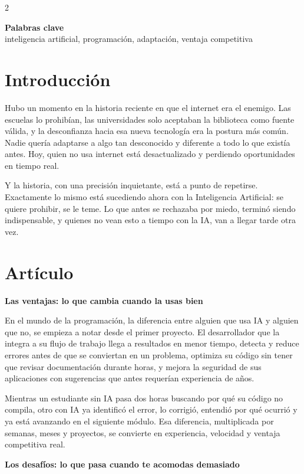 \documentclass[10pt,spanish,Letterpaper,openany]{book}
\let\origtextbf\textbf
\renewcommand{\textbf}[1]{{\color{textlinetitle}\origtextbf{#1}}}
\begin{document}
\begin {multicols}{2}

\textbf{Palabras clave}\\
inteligencia artificial, programación, adaptación, ventaja competitiva

\section{Introducción}\label{introducciuxf3n-7}

Hubo un momento en la historia reciente en que el internet era el enemigo. Las escuelas lo prohibían, las universidades solo aceptaban la biblioteca como fuente válida, y la desconfianza hacia esa nueva tecnología era la postura más común. Nadie quería adaptarse a algo tan desconocido y diferente a todo lo que existía antes. Hoy, quien no usa internet está desactualizado y perdiendo oportunidades en tiempo real.

Y la historia, con una precisión inquietante, está a punto de repetirse. Exactamente lo mismo está sucediendo ahora con la Inteligencia Artificial: se quiere prohibir, se le teme. Lo que antes se rechazaba por miedo, terminó siendo indispensable, y quienes no vean esto a tiempo con la IA, van a llegar tarde otra vez.

\section{Artículo}\label{artuxedculo-4}

\textbf{Las ventajas: lo que cambia cuando la usas bien}

En el mundo de la programación, la diferencia entre alguien que usa IA y alguien que no, se empieza a notar desde el primer proyecto. El desarrollador que la integra a su flujo de trabajo llega a resultados en menor tiempo, detecta y reduce errores antes de que se conviertan en un problema, optimiza su código sin tener que revisar documentación durante horas, y mejora la seguridad de sus aplicaciones con sugerencias que antes requerían experiencia de años.

Mientras un estudiante sin IA pasa dos horas buscando por qué su código no compila, otro con IA ya identificó el error, lo corrigió, entendió por qué ocurrió y ya está avanzando en el siguiente módulo. Esa diferencia, multiplicada por semanas, meses y proyectos, se convierte en experiencia, velocidad y ventaja competitiva real.

\textbf{Los desafíos: lo que pasa cuando te acomodas demasiado}


\end{multicols}
\end{document}
